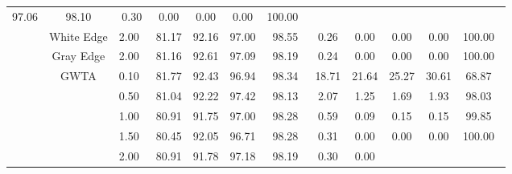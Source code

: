 \begin{table}[htbp]
{\begin{tabular}{cc|c|ccccccccc}
  \multicolumn{1}{c|}{97.06} &
  \multicolumn{1}{c|}{98.10} &
  \multicolumn{1}{c|}{0.30} &
  \multicolumn{1}{c|}{0.00} &
  \multicolumn{1}{c|}{0.00} &
  \multicolumn{1}{c|}{0.00} &
  100.00\ \\ \cline{2-12} 
\multicolumn{1}{c|}{} &
  White Edge &
  2.00\ &
  \multicolumn{1}{c|}{81.17} &
  \multicolumn{1}{c|}{92.16} &
  \multicolumn{1}{c|}{97.00} &
  \multicolumn{1}{c|}{98.55} &
  \multicolumn{1}{c|}{0.26} &
  \multicolumn{1}{c|}{0.00} &
  \multicolumn{1}{c|}{0.00} &
  \multicolumn{1}{c|}{0.00} &
  100.00\ \\ \cline{2-12} 
\multicolumn{1}{c|}{} &
  Gray Edge &
  2.00\ &
  \multicolumn{1}{c|}{81.16} &
  \multicolumn{1}{c|}{92.61} &
  \multicolumn{1}{c|}{97.09} &
  \multicolumn{1}{c|}{98.19} &
  \multicolumn{1}{c|}{0.24} &
  \multicolumn{1}{c|}{0.00} &
  \multicolumn{1}{c|}{0.00} &
  \multicolumn{1}{c|}{0.00} &
  100.00\ \\ \cline{2-12} 
\multicolumn{1}{c|}{} &
  \multirow{9}{*}{GWTA}&
  0.10\ &
  \multicolumn{1}{c|}{81.77} &
  \multicolumn{1}{c|}{92.43} &
  \multicolumn{1}{c|}{96.94} &
  \multicolumn{1}{c|}{98.34} &
  \multicolumn{1}{c|}{18.71} &
  \multicolumn{1}{c|}{21.64} &
  \multicolumn{1}{c|}{25.27} &
  \multicolumn{1}{c|}{30.61} &
  68.87\ \\ \cline{3-12} 
\multicolumn{1}{c|}{} &
   &
  0.50\ &
  \multicolumn{1}{c|}{81.04} &
  \multicolumn{1}{c|}{92.22} &
  \multicolumn{1}{c|}{97.42} &
  \multicolumn{1}{c|}{98.13} &
  \multicolumn{1}{c|}{2.07} &
  \multicolumn{1}{c|}{1.25} &
  \multicolumn{1}{c|}{1.69} &
  \multicolumn{1}{c|}{1.93} &
  98.03\ \\ \cline{3-12} 
\multicolumn{1}{c|}{} &
   &
  1.00\ &
  \multicolumn{1}{c|}{80.91} &
  \multicolumn{1}{c|}{91.75} &
  \multicolumn{1}{c|}{97.00} &
  \multicolumn{1}{c|}{98.28} &
  \multicolumn{1}{c|}{0.59} &
  \multicolumn{1}{c|}{0.09} &
  \multicolumn{1}{c|}{0.15} &
  \multicolumn{1}{c|}{0.15} &
  99.85\ \\ \cline{3-12} 
\multicolumn{1}{c|}{} &
   &
  1.50\ &
  \multicolumn{1}{c|}{80.45} &
  \multicolumn{1}{c|}{92.05} &
  \multicolumn{1}{c|}{96.71} &
  \multicolumn{1}{c|}{98.28} &
  \multicolumn{1}{c|}{0.31} &
  \multicolumn{1}{c|}{0.00} &
  \multicolumn{1}{c|}{0.00} &
  \multicolumn{1}{c|}{0.00} &
  100.00\ \\ \cline{3-12} 
\multicolumn{1}{c|}{} &
   &
  2.00\ &
  \multicolumn{1}{c|}{80.91} &
  \multicolumn{1}{c|}{91.78} &
  \multicolumn{1}{c|}{97.18} &
  \multicolumn{1}{c|}{98.19} &
  \multicolumn{1}{c|}{0.30} &
  \multicolumn{1}{c|}{0.00} &

\end{tabular}}
\end{table}
